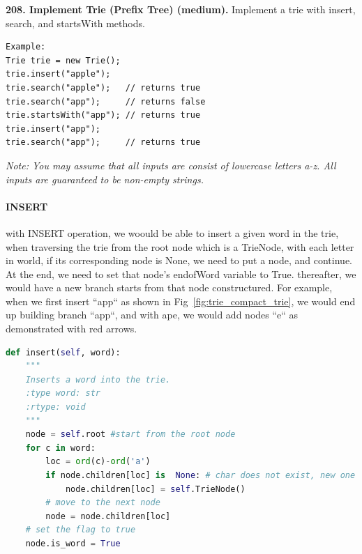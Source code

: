 \documentclass[../main.tex]{subfiles}
\begin{document}
\begin{examples}
\item \textbf{208. Implement Trie (Prefix Tree) (medium).} Implement a trie with insert, search, and startsWith methods.
\begin{lstlisting}
Example:
Trie trie = new Trie();
trie.insert("apple");
trie.search("apple");   // returns true
trie.search("app");     // returns false
trie.startsWith("app"); // returns true
trie.insert("app");   
trie.search("app");     // returns true
\end{lstlisting}
\textit{Note: You may assume that all inputs are consist of lowercase letters a-z. All inputs are guaranteed to be non-empty strings.}

\paragraph{INSERT} with INSERT operation, we woould be able to insert a given word in the trie, when traversing the trie from the root node which is a TrieNode, with each letter in world, if its corresponding node is None, we need to put a node, and continue. At the end, we need to set that node's endofWord variable to True. thereafter, we would have a new branch starts from that node constructured. For example, when we first insert ``app`` as shown in Fig~\ref{fig:trie_compact_trie}, we would end up building branch ``app``, and with ape, we would add nodes ``e`` as demonstrated with red arrows. 
\begin{lstlisting}[language=Python]
def insert(self, word):
    """
    Inserts a word into the trie.
    :type word: str
    :rtype: void
    """
    node = self.root #start from the root node
    for c in word:
        loc = ord(c)-ord('a')
        if node.children[loc] is  None: # char does not exist, new one
            node.children[loc] = self.TrieNode()
        # move to the next node
        node = node.children[loc]
    # set the flag to true
    node.is_word = True 
\end{lstlisting}


\end{examples}
\end{document}
